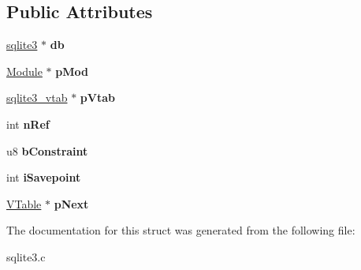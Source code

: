\subsection*{Public Attributes}
\begin{DoxyCompactItemize}
\item 
\hyperlink{structsqlite3}{sqlite3} $\ast$ {\bfseries db}\hypertarget{structVTable_a855b43c118d693910e9060cc9d9ac91a}{}\label{structVTable_a855b43c118d693910e9060cc9d9ac91a}

\item 
\hyperlink{structModule}{Module} $\ast$ {\bfseries p\+Mod}\hypertarget{structVTable_ae444452a7168e2f4224a75768abe8312}{}\label{structVTable_ae444452a7168e2f4224a75768abe8312}

\item 
\hyperlink{structsqlite3__vtab}{sqlite3\+\_\+vtab} $\ast$ {\bfseries p\+Vtab}\hypertarget{structVTable_ae15b9cb002c013019dcbac919bda9ac8}{}\label{structVTable_ae15b9cb002c013019dcbac919bda9ac8}

\item 
int {\bfseries n\+Ref}\hypertarget{structVTable_a12ffe156e5e8e7d19ed029ccfe4ab5dc}{}\label{structVTable_a12ffe156e5e8e7d19ed029ccfe4ab5dc}

\item 
u8 {\bfseries b\+Constraint}\hypertarget{structVTable_a5a970416a76dbe3be500c9458c89550d}{}\label{structVTable_a5a970416a76dbe3be500c9458c89550d}

\item 
int {\bfseries i\+Savepoint}\hypertarget{structVTable_a19f1c6c5f5fedabba7e605bbe15358e4}{}\label{structVTable_a19f1c6c5f5fedabba7e605bbe15358e4}

\item 
\hyperlink{structVTable}{V\+Table} $\ast$ {\bfseries p\+Next}\hypertarget{structVTable_af3cac5e5a38508d0111acb9aa6c5f435}{}\label{structVTable_af3cac5e5a38508d0111acb9aa6c5f435}

\end{DoxyCompactItemize}


The documentation for this struct was generated from the following file\+:\begin{DoxyCompactItemize}
\item 
sqlite3.\+c\end{DoxyCompactItemize}
